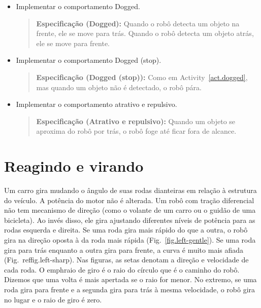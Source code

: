\begin{framed}
\begin{itemize}
\item Implementar o comportamento Dogged.
\begin{quote}
\normalsize\noindent\textbf{Especificação (Dogged):} Quando o robô detecta um objeto na frente, ele se move para trás. Quando o robô detecta um objeto atrás, ele se move para frente.
\end{quote}
\end{itemize}
\end{framed}

\begin{framed}
\begin{itemize}
\item Implementar o comportamento Dogged (stop).
\begin{quote}
\normalsize\noindent\textbf{Especificação (Dogged (stop)):} Como em Activity~\ref{act.dogged}, mas quando um objeto não é detectado, o robô pára.
\end{quote}
\end{itemize}
\end{framed}

\begin{framed}
\begin{itemize}
\item Implementar o comportamento atrativo e repulsivo.
\begin{quote}
\normalsize\noindent\textbf{Especificação (Atrativo e repulsivo):} Quando um objeto se aproxima do robô por trás, o robô foge até ficar fora de alcance.
\end{quote}
\end{itemize}
\end{framed}

\section{Reagindo e virando}\label{s.turning}

Um carro gira mudando o ângulo de suas rodas dianteiras em relação à estrutura do veículo. A potência do motor não é alterada. Um robô com tração diferencial não tem mecanismo de direção (como o volante de um carro ou o guidão de uma bicicleta). Ao invés disso, ele gira ajustando diferentes níveis de potência para as rodas esquerda e direita. Se uma roda gira mais rápido do que a outra, o robô gira na direção oposta à da roda mais rápida (Fig.~\ref{fig.left-gentle}). Se uma roda gira para trás enquanto a outra gira para frente, a curva é muito mais afiada (Fig.~ref{fig.left-sharp}). Nas figuras, as setas denotam a direção e velocidade de cada roda. O emph{raio de giro} é o raio do círculo que é o caminho do robô. Dizemos que uma volta é mais apertada se o raio for menor. No extremo, se uma roda gira para frente e a segunda gira para trás à mesma velocidade, o robô gira no lugar e o raio de giro é zero.

